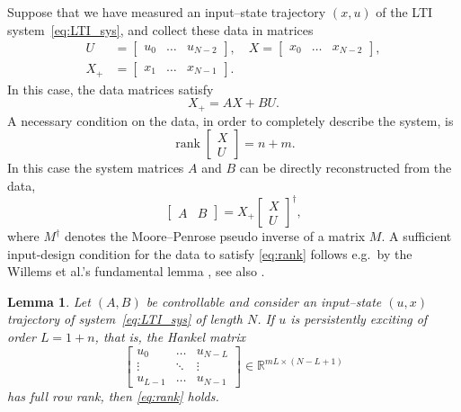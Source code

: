 \documentclass[11pt]{article}
\theoremstyle{plain}
\newtheorem{lemma}[theorem]{Lemma}
\theoremstyle{definition}
\theoremstyle{remark}
\begin{document}
Suppose that we have measured an input--state trajectory $(x,u)$ of the LTI system~\eqref{eq:LTI_sys}, and collect these data in matrices
\begin{equation}
    \label{eq:data_matrices}
    \begin{aligned}
    U &= \begin{bmatrix}
        u_0 & \dots & u_{N-2}
    \end{bmatrix},\quad X = \begin{bmatrix}
        x_0 & \dots & x_{N-2}
    \end{bmatrix},\\
    X_+ &= \begin{bmatrix}
        x_1 & \dots & x_{N-1}
    \end{bmatrix}.
    \end{aligned}
\end{equation}
In this case, the data matrices satisfy
\begin{equation}
\label{eq:data_dynamcis}
    X_+ = A X + BU.
\end{equation}
A necessary condition on the data, in order to completely describe the system, is
\begin{equation}
    \label{eq:rank}
    \operatorname{rank}\begin{bmatrix}
        X\\ U
    \end{bmatrix} = n+m.
\end{equation}
In this case the system matrices $A$ and $B$ can be directly reconstructed from the data,
\begin{equation}
    \begin{bmatrix}
        A & B
    \end{bmatrix} = X_+ \begin{bmatrix}
        X\\U
    \end{bmatrix}^\dagger,
\end{equation}
where $M^\dagger$ denotes the Moore--Penrose pseudo inverse of a matrix $M$. A sufficient input-design condition for the data to satisfy \eqref{eq:rank} follows e.g.\ by the Willems et al.'s fundamental lemma \cite[Theorem~1]{Willems2005}, see also \cite[Thorem~1]{van2020willems}.
\begin{lemma}
\label{lem:FL}
    Let $(A,B)$ be controllable and consider an input--state $(u,x)$ trajectory of system~\eqref{eq:LTI_sys} of length $N$. If $u$ is persistently exciting of order $L=1+n$, that is, the Hankel matrix
    \begin{equation}
        \begin{bmatrix}
            u_0 & \dots & u_{N-L}\\
            \vdots & \ddots & \vdots\\
            u_{L-1} & \dots & u_{N-1}
        \end{bmatrix}\in\mathbb{R}^{mL\times (N-L+1)}
    \end{equation}
    has full row rank, then \eqref{eq:rank} holds.
\end{lemma}
\end{document}
